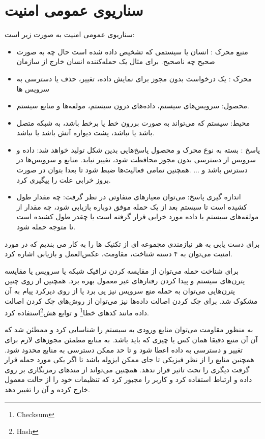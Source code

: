 \section{سناریوی عمومی امنیت}
سناریو‌ی عمومی امنیت به صورت زیر است:
\begin{itemize}
\item
منبع محرک : انسان یا سیستمی که تشخیص داده شده است حال چه به صورت صحیح چه ناصحیح. برای مثال یک حمله‌کننده انسان خارج از سازمان
\item
محرک : یک در‌خواست بدون مجوز برای نمایش داده، تغییر، حذف یا دسترسی به سرویس ها
\item
محصول: 
سرویس‌های سیستم، داده‌های درون سیستم، مولفه‌ها و منابع سیستم.
\item
محیط:
سیستم که می‌تواند به صورت بررون خط یا برخط باشد، به شبکه متصل باشد یا نباشد، پشت دیواره آتش باشد یا نباشد.
\item
پاسخ : بسته به نوع محرک و محصول پاسخ‌هایی بدین شکل تولید خواهد شد: داده و سرویس از دسترسی بدون مجوز محافظت شود، تغییر نیابد. منابع و سرویس‌ها در دسترس باشد و ... .همچنین تمامی فعالیت‌ها ضبط شود تا بعدا بتوان در صورت بروز خرابی علت را پیگیری کرد. 
\item
اندازه گیری پاسخ: می‌توان معیارهای متفاوتی در نظر گرفت: چه مقدار طول کشیده است تا سیستم بعد از یک حمله موفق دوباره بازیابی شود، چه مقدار از مولفه‌های سیستم یا داده مورد خرابی قرار گرفته است یا چقدر طول کشیده است تا متوجه حمله شود.
\end{itemize}

برای دست یابی به هر نیازمندی مجموعه ای از تکنیک ها را به کار می بندیم که در مورد امنیت می‌توان به ۴ دسته شناخت، مقاومت، عکس‌العمل و بازیابی اشاره کرد.


برای شناخت حمله می‌توان از مقایسه کردن ترافیک شبکه یا سرویس یا مقایسه پترن‌های سیستم و پیدا کردن رفتار‌های غیر معمول بهره برد.
همچنین از روی چنین پترن‌هایی می‌توان به حمله منع سرویس نیز پی برد یا از روی دیرکرد پیام به آن مشکوک شد. برای چک کردن اصالت داد‌ه‌ها نیز می‌توان از روش‌های چک کردن اصالت داده مانند کدهای خطا\footnote{Checksum}
و توابع هش\footnote{Hash}استفاده کرد.

به منظور مقاومت می‌توان منابع ورودی به سیستم را شناسایی کرد و ممطئن شد که آن آن منبع دقیقا همان کس یا چیزی که باید باشد. به منابع مطمئن مجوزهای لازم برای تغییر و دسترسی به داده اعطا شود و تا حد ممکن دسترسی به منابع محدود شود. 
همچنین منابع را از نظر فیزیکی تا جای ممکن ایزوله باشد تا اگر یکی مورد حمله قرار گرفت دیگری را تحت تاثیر قرار ندهد. همچنین می‌تواند از مندهای رمزنگاری بر روی داده و ارتباط استفاده کرد و کاربر را مجبور کرد که تنظیمات خود را از حالت معمول خارج کرده و آن را تغییر دهد.

